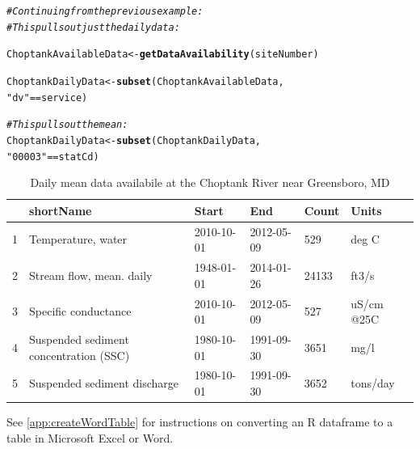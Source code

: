 \documentclass[a4paper,11pt]{article}\usepackage[]{graphicx}\usepackage[]{color}
\makeatletter
\newcommand{\hlstr}[1]{\textcolor[rgb]{0.192,0.494,0.8}{#1}}%
\newcommand{\hlcom}[1]{\textcolor[rgb]{0.678,0.584,0.686}{\textit{#1}}}%
\newcommand{\hlopt}[1]{\textcolor[rgb]{0,0,0}{#1}}%
\newcommand{\hlstd}[1]{\textcolor[rgb]{0.345,0.345,0.345}{#1}}%
\newcommand{\hlkwb}[1]{\textcolor[rgb]{0.69,0.353,0.396}{#1}}%
\newcommand{\hlkwd}[1]{\textcolor[rgb]{0.737,0.353,0.396}{\textbf{#1}}}%
\newenvironment{kframe}{%
 \def\at@end@of@kframe{}%
 \ifinner\ifhmode%
  \def\at@end@of@kframe{\end{minipage}}%
  \begin{minipage}{\columnwidth}%
 \fi\fi%
 \def\FrameCommand##1{\hskip\@totalleftmargin \hskip-\fboxsep
 \colorbox{shadecolor}{##1}\hskip-\fboxsep
     \hskip-\linewidth \hskip-\@totalleftmargin \hskip\columnwidth}%
 \MakeFramed {\advance\hsize-\width
   \@totalleftmargin\z@ \linewidth\hsize
   \@setminipage}}%
 {\par\unskip\endMakeFramed%
 \at@end@of@kframe}
\newenvironment{knitrout}{}{} %
\makeatother
\begin{document}
\begin{knitrout}
\color{fgcolor}\begin{kframe}
\begin{alltt}
\hlcom{# Continuing from the previous example:}
\hlcom{# This pulls out just the daily data:}

\hlstd{ChoptankAvailableData} \hlkwb{<-} \hlkwd{getDataAvailability}\hlstd{(siteNumber)}

\hlstd{ChoptankDailyData} \hlkwb{<-} \hlkwd{subset}\hlstd{(ChoptankAvailableData,}
                            \hlstr{"dv"} \hlopt{==} \hlstd{service)}

\hlcom{# This pulls out the mean:}
\hlstd{ChoptankDailyData} \hlkwb{<-} \hlkwd{subset}\hlstd{(ChoptankDailyData,}
                            \hlstr{"00003"} \hlopt{==} \hlstd{statCd)}
\end{alltt}
\end{kframe}
\end{knitrout}


\begin{table}[ht]
\centering
\begin{tabular}{rlllll}
  \hline
 & shortName & Start & End & Count & Units \\ 
  \hline
1 & Temperature, water & 2010-10-01 & 2012-05-09 & 529 & deg C \\ 
  2 & Stream flow, mean. daily & 1948-01-01 & 2014-01-26 & 24133 & ft3/s \\ 
  3 & Specific conductance & 2010-10-01 & 2012-05-09 & 527 & uS/cm @25C \\ 
  4 & Suspended sediment concentration (SSC) & 1980-10-01 & 1991-09-30 & 3651 & mg/l \\ 
  5 & Suspended sediment discharge & 1980-10-01 & 1991-09-30 & 3652 & tons/day \\ 
   \hline
\end{tabular}
\caption{Daily mean data availabile at the Choptank River near Greensboro, MD} 
\label{tab:gda}
\end{table}



See \ref{app:createWordTable} for instructions on converting an R dataframe to a table in Microsoft Excel or Word.

\FloatBarrier

\end{document}
